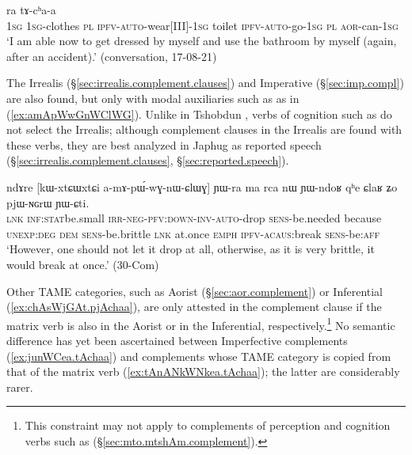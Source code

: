 \begin{exe}
\ex \label{ex:junWCea.tAchaa}
  ra tɤ-cʰa-a \\
 \textsc{1sg} \textsc{1sg}-clothes \textsc{pl} \textsc{ipfv}-\textsc{auto}-wear[III]-\textsc{1sg} toilet \textsc{ipfv}-\textsc{auto}-go-\textsc{1sg} \textsc{pl} \textsc{aor}-can-\textsc{1sg} \\
 \glt  `I am able now to get dressed by myself and use the bathroom by myself (again, after an accident).' (conversation, 17-08-21)
 \end{exe}

The Irrealis (§\ref{sec:irrealis.complement.clauses}) and Imperative (§\ref{sec:imp.compl}) are also found, but only with modal auxiliaries such as  as in (\ref{ex:amApWwGnWClWG}). Unlike in Tshobdun \citep[807]{jackson07irrealis},  verbs of cognition such as  do not select the Irrealis; although complement clauses in the Irrealis are found with these verbs, they are best analyzed in Japhug as reported speech (§\ref{sec:irrealis.complement.clauses}, §\ref{sec:reported.speech}). 

\begin{exe}
\ex \label{ex:amApWwGnWClWG}
\gll  ndɤre [kɯ-xtɕɯ\redp{}xtɕi a-mɤ-pɯ́-wɣ-nɯ-ɕlɯɣ] ɲɯ-ra ma rca nɯ ɲɯ-ndoʁ qʰe ɕlaʁ ʑo pjɯ-ɴɢrɯ ɲɯ-ɕti. \\
\textsc{lnk} \textsc{inf}:\textsc{stat}\redp{}be.small \textsc{irr}-\textsc{neg}-\textsc{pfv}:\textsc{down}-\textsc{inv}-\textsc{auto}-drop \textsc{sens}-be.needed because \textsc{unexp}:\textsc{deg} \textsc{dem} \textsc{sens}-be.brittle \textsc{lnk} at.once \textsc{emph} \textsc{ipfv}-\textsc{acaus}:break \textsc{sens}-be:\textsc{aff} \\
\glt `However, one should not let it drop at all, otherwise, as it is very brittle, it would break at once.' (30-Com)
\end{exe}

Other TAME categories, such as Aorist (§\ref{sec:aor.complement}) or Inferential (\ref{ex:chAsWjGAt.pjAchaa}), are only attested in the complement clause if the matrix verb is also in the Aorist or in the Inferential, respectively.\footnote{This constraint may not apply to complements of perception and cognition verbs such as  (§\ref{sec:mto.mtshAm.complement}). } No semantic difference has yet been ascertained between Imperfective complements (\ref{ex:junWCea.tAchaa}) and complements whose TAME category is copied from that of the matrix verb (\ref{ex:tAnANkWNkea.tAchaa}); the latter are considerably rarer.

